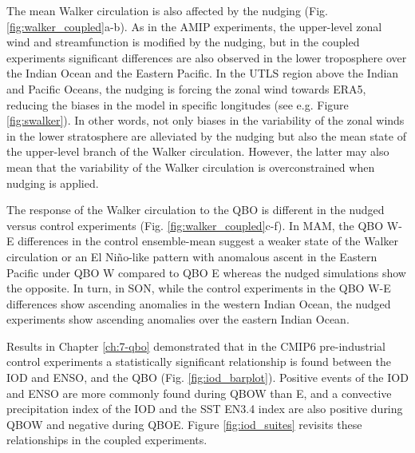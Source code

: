 
The mean Walker circulation is also affected by the nudging (Fig. \ref{fig:walker_coupled}a-b). As in the AMIP experiments, the upper-level zonal wind and streamfunction is modified by the nudging, but in the coupled experiments significant differences are also observed in the lower troposphere over the Indian Ocean and the Eastern Pacific. 
In the UTLS region above the Indian and Pacific Oceans, the nudging is forcing the zonal wind towards ERA5,  reducing the biases in the model in specific longitudes (see e.g. Figure \ref{fig:swalker}). In other words, not only biases in the variability of the zonal winds in the lower stratosphere are alleviated by the nudging but also the mean state of the upper-level branch of the Walker circulation. However, the latter may also mean that the variability of the Walker circulation is overconstrained when nudging is applied. 

The response of the Walker circulation to the QBO is different in the nudged versus control experiments (Fig. \ref{fig:walker_coupled}c-f). In MAM, the QBO W-E differences in the control ensemble-mean suggest a weaker state of the Walker circulation or an El Niño-like pattern with anomalous ascent in the Eastern Pacific under QBO W compared to QBO E whereas the nudged simulations show the opposite. 
In turn, in SON, while the control experiments in the QBO W-E differences show ascending anomalies in the western Indian Ocean, the nudged experiments show ascending anomalies over the eastern Indian Ocean. 


Results in Chapter \ref{ch:7-qbo} demonstrated that in the CMIP6 pre-industrial control experiments a statistically significant relationship is found between the IOD and ENSO, and the QBO (Fig. \ref{fig:iod_barplot}). 
Positive events of the IOD and ENSO are more commonly found during QBOW than E, and a convective precipitation index of the IOD and the SST EN3.4 index are also positive during QBOW and negative during QBOE. 
Figure \ref{fig:iod_suites} revisits these relationships in the coupled experiments. 

